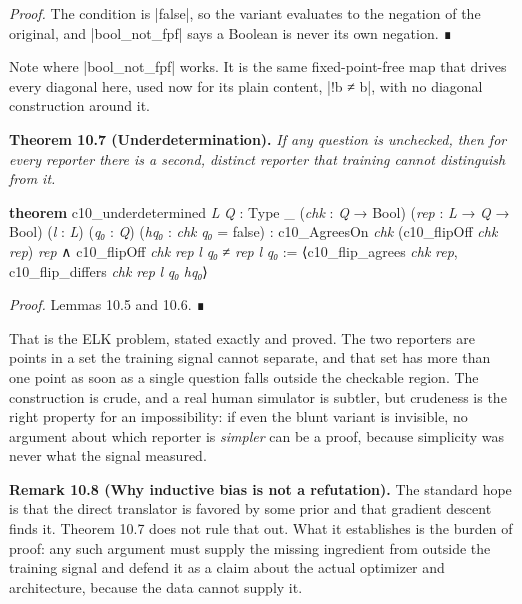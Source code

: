 \documentclass{memoir}
\begin{document}
\emph{Proof.} The condition is \LeanVerb|false|, so the variant evaluates to the negation of
the original, and \LeanVerb|bool_not_fpf| says a Boolean is never its own negation.
∎

Note where \LeanVerb|bool_not_fpf| works. It is the same fixed-point-free map that
drives every diagonal here, used now for its plain content, \LeanVerb|!b ≠ b|, with no
diagonal construction around it.

\textbf{Theorem 10.7 (Underdetermination).} \emph{If any question is unchecked, then
for every reporter there is a second, distinct reporter that training cannot
distinguish from it.}

\begin{LeanVerbatim}
\textbf{theorem} c10_underdetermined \textit{L} \textit{Q} : Type _
    (\textit{chk} : \textit{Q} → Bool) (\textit{rep} : \textit{L} → \textit{Q} → Bool)
    (\textit{l} : \textit{L}) (\textit{q₀} : \textit{Q}) (\textit{hq₀} : \textit{chk} \textit{q₀} = false) :
    c10_AgreesOn \textit{chk} (c10_flipOff \textit{chk} \textit{rep}) \textit{rep}
      ∧ c10_flipOff \textit{chk} \textit{rep} \textit{l} \textit{q₀} ≠ \textit{rep} \textit{l} \textit{q₀} :=
  ⟨c10_flip_agrees \textit{chk} \textit{rep},
    c10_flip_differs \textit{chk} \textit{rep} \textit{l} \textit{q₀} \textit{hq₀}⟩

\end{LeanVerbatim}


\emph{Proof.} Lemmas 10.5 and 10.6. ∎

That is the ELK problem, stated exactly and proved. The two reporters are points
in a set the training signal cannot separate, and that set has more than one
point as soon as a single question falls outside the checkable region. The
construction is crude, and a real human simulator is subtler, but crudeness is
the right property for an impossibility: if even the blunt variant is invisible,
no argument about which reporter is \emph{simpler} can be a proof, because simplicity
was never what the signal measured.

\textbf{Remark 10.8 (Why inductive bias is not a refutation).} The standard hope is that the
direct translator is favored by some prior and that gradient descent finds it.
Theorem 10.7 does not rule that out. What it establishes is the burden of proof:
any such argument must supply the missing ingredient from outside the training
signal and defend it as a claim about the actual optimizer and architecture,
because the data cannot supply it.
\end{document}
